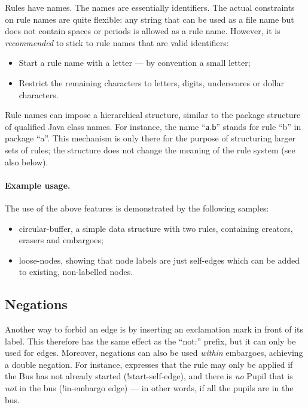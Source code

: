Rules have names. The names are essentially identifiers. The actual constraints
on rule names are quite flexible: any string that can be used as a file name
but does not contain spaces or periods is allowed as a rule name. However, it
is \emph{recommended} to stick to rule names that are valid identifiers:
%
\begin{itemize}\noitemsep
\item Start a rule name with a letter --- by convention a small letter;
\item Restrict the remaining characters to letters, digits, underscores or
  dollar characters.
\end{itemize}
%
Rule names can impose a hierarchical structure, similar to the package
structure of qualified Java class names. For instance, the name
``$\textsf{a.b}$'' stands for rule ``\textsf{b}'' in package
``\textsf{a}''. This mechanism is only there for the purpose of structuring
larger sets of rules; the structure does not change the meaning of the rule
system (see also  below).

\paragraph{Example usage.}

The use of the above features is demonstrated by the following \Groove samples:
%
\begin{itemize}\noitemsep
\item \textsf{circular-buffer}, a simple data structure with two rules,
  containing creators, erasers and embargoes;
\item \textsf{loose-nodes}, showing that node labels are just self-edges which
  can be added to existing, non-labelled nodes.
\end{itemize}

\subsection{Negations}

Another way to forbid an edge is by inserting an exclamation mark in front of
its label. This therefore has the same effect as the ``\textsf{not:}'' prefix,
but it can only be used for edges. Moreover, negations can also be used
\emph{within} embargoes, achieving a double negation. For instance,
 expresses that the rule may only be applied if the
\textsf{Bus} has not already started (\textsf{!start}-self-edge), and there is
\emph{no} \textsf{Pupil} that is \emph{not} in the bus (\textsf{!in}-embargo
edge) --- in other words, if all the pupils are in the bus.

